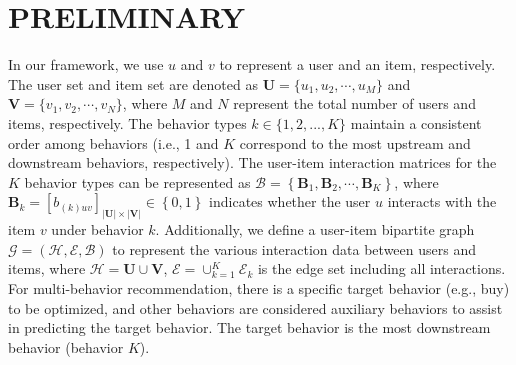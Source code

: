 \section{PRELIMINARY}
\label{Definition}
In our framework, we use $u$ and $v$ to represent a user and an item, respectively. The user set and item set are denoted as $\mathbf{U}=\{u_1, u_2, \cdots, u_M\}$ and $\mathbf{V}=\{v_1, v_2, \cdots, v_N\}$, where $M$ and $N$ represent the total number of users and items, respectively. The behavior types $k \in \{1,2,...,K\}$ maintain a consistent order among behaviors (i.e., 1 and $K$ correspond to the most upstream and downstream behaviors, respectively). The user-item interaction matrices for the $K$ behavior types can be represented as $\mathcal{B} =\left\{\mathbf{B}_{1},\mathbf{B}_{2},\cdots,\mathbf{B}_{K}\right\}$, where $\mathbf{B}_{k}=\left[b_{(k)uv}\right]_{|\mathbf{U}|\times|\mathbf{V}|}\in \left\{0, 1\right\}$ indicates whether the user $u$ interacts with the item $v$ under behavior $k$. Additionally, we define a user-item bipartite graph $\mathcal{G}=(\mathcal{H}, \mathcal{E}, \mathcal{B})$ to represent the various interaction data between users and items, where $\mathcal{H} = \mathbf{U}\cup\mathbf{V}$, $\mathcal{E} = \cup_{k = 1}^{K}\mathcal{E}_{k}$ is the edge set including all interactions. For multi-behavior recommendation, there is a specific target behavior (e.g., buy) to be optimized, and other behaviors are considered auxiliary behaviors to assist in predicting the target behavior. The target behavior is the most downstream behavior (behavior $K$).

